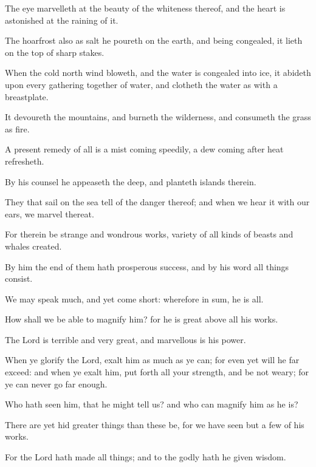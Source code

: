 {\par }{\PP {}The eye marvelleth at the beauty of the whiteness thereof, and the heart is astonished at the raining of it.
\par }{\PP {}The hoarfrost also as salt he poureth on the earth, and being congealed, it lieth on the top of sharp stakes.
\par }{\PP {}When the cold north wind bloweth, and the water is congealed into ice, it abideth upon every gathering together of water, and clotheth the water as with a breastplate.
\par }{\PP {}It devoureth the mountains, and burneth the wilderness, and consumeth the grass as fire.
\par }{\PP {}A present remedy of all is a mist coming speedily, a dew coming after heat refresheth.
\par }{\PP {}By his counsel he appeaseth the deep, and planteth islands therein.
\par }{\PP {}They that sail on the sea tell of the danger thereof; and when we hear it with our ears, we marvel thereat.
\par }{\PP {}For therein be strange and wondrous works, variety of all kinds of beasts and whales created.
\par }{\PP {}By him the end of them hath prosperous success, and by his word all things consist.
\par }{\PP {}We may speak much, and yet come short: wherefore in sum, he is all.
\par }{\PP {}How shall we be able to magnify him? for he is great above all his works.
\par }{\PP {}The Lord is terrible and very great, and marvellous is his power.
\par }{\PP {}When ye glorify the Lord, exalt him as much as ye can; for even yet will he far exceed: and when ye exalt him, put forth all your strength, and be not weary; for ye can never go far enough.
\par }{\PP {}Who hath seen him, that he might tell us? and who can magnify him as he is?
\par }{\PP {}There are yet hid greater things than these be, for we have seen but a few of his works.
\par }{\PP {}For the Lord hath made all things; and to the godly hath he given wisdom.

}
